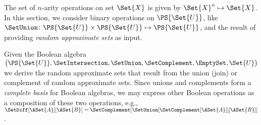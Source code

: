 \documentclass[ ../main.tex]{subfiles}
\begin{document}
The set of $n$-arity operations on set $\Set{X}$ is given by $\Set{X}^n \mapsto \Set{X}$.
In this section, we consider binary operations on $\PS{\Set{U}}$, like $\SetUnion \colon \PS{\Set{U}} \times \PS{\Set{U}} \mapsto \PS{\Set{U}}$, and the result of providing \emph{random approximate sets} as input.


Given the Boolean algebra
$\left(\PS{\Set{U}}, \SetIntersection, \SetUnion, \SetComplement, \EmptySet, \Set{U}\right)
$
we derive the random approximate sets that result from the union (join) or complement of random approximate sets.
Since unions and complements form a \emph{complete basis} for Boolean algebras, we may express other Boolean operations as a composition of these two operations, e.g., $\SetDiff[\ASet{A}][\ASet{B}] = \SetComplement[\SetUnion[\SetComplement[\ASet{A}]][\ASet{B}]]$.
\end{document}
